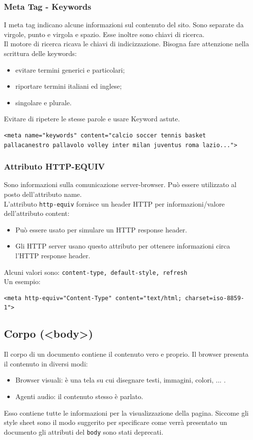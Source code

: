 \documentclass{article}
\begin{document}
\subsubsection{Meta Tag - Keywords}
I meta tag indicano alcune informazioni sul contenuto del sito. Sono separate da virgole, punto e virgola e spazio.
Esse inoltre sono chiavi di ricerca. 
\\ Il motore di ricerca ricava le chiavi di indicizzazione. Bisogna fare attenzione nella scrittura delle keywords:
\begin{itemize}
    \item evitare termini generici e particolari;
    \item riportare termini italiani ed inglese;
    \item singolare e plurale.
\end{itemize}
Evitare di ripetere le stesse parole e usare Keyword astute.

\begin{lstlisting}[style=htmlstyle]
<meta name="keywords" content="calcio soccer tennis basket pallacanestro pallavolo volley inter milan juventus roma lazio...">
\end{lstlisting}
\subsubsection{Attributo HTTP-EQUIV}
Sono informazioni sulla comunicazione server-browser. Può essere utilizzato al posto dell'attributo name.
\\ L'attributo \texttt{http-equiv} fornisce un header HTTP per informazioni/valore dell'attributo content:
\begin{itemize}
    \item Può essere usato per simulare un HTTP response header.
    \item Gli HTTP server usano questo attributo per ottenere informazioni circa l'HTTP response header.
\end{itemize}
Alcuni valori sono: \texttt{content-type, default-style, refresh}
\\ Un esempio:
\begin{lstlisting}[style=htmlstyle]
<meta http-equiv="Content-Type" content="text/html; charset=iso-8859-1">
\end{lstlisting}
\subsection{Corpo (<body>)}
Il corpo di un documento contiene il contenuto vero e proprio. Il browser presenta il contenuto in diversi modi:
\begin{itemize}
    \item Browser visuali: è una tela su cui disegnare testi, immagini, colori, ... .
    \item Agenti audio: il contenuto stesso è parlato.
\end{itemize}
Esso contiene tutte le informazioni per la visualizzazione della pagina. Siccome gli style sheet sono il modo suggerito per specificare come verrà presentato un documento
gli attributi del \texttt{body} sono stati deprecati.
\end{document}

